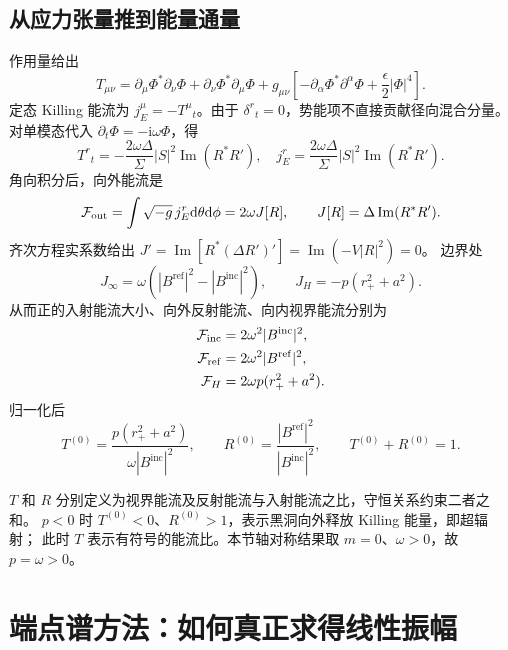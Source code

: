 \documentclass[UTF8,fontset=fandol,11pt,a4paper]{ctexart}
\newcommand{\ii}{\mathrm{i}}
\newcommand{\dd}{\mathrm{d}}
\newcommand{\Ima}{\operatorname{Im}}
\newcommand{\Bin}{B^{\mathrm{inc}}}
\newcommand{\Bref}{B^{\mathrm{ref}}}
\numberwithin{equation}{section}
\begin{document}
\subsection{从应力张量推到能量通量}
作用量给出
\begin{equation}
T_{\mu\nu}=\partial_\mu\Phi^*\partial_\nu\Phi+\partial_\nu\Phi^*\partial_\mu\Phi
+g_{\mu\nu}\left[-\partial_\alpha\Phi^*\partial^\alpha\Phi
+\frac{\epsilon}{2}|\Phi|^4\right].
\end{equation}
定态 Killing 能流为 $j_E^\mu=-T^\mu{}_t$。由于 $\delta^r{}_t=0$，势能项不直接贡献径向混合分量。
对单模态代入 $\partial_t\Phi=-\ii\omega\Phi$，得
\begin{equation}
T^r{}_t=-\frac{2\omega\Delta}{\Sigma}|S|^2\Ima(R^*R'),
\quad j_E^r=\frac{2\omega\Delta}{\Sigma}|S|^2\Ima(R^*R').
\end{equation}
角向积分后，向外能流是
\begin{equation}
\mathcal F_{\rm out}=\int\sqrt{-g}\,j_E^r\dd\theta\dd\phi
=2\omega J[R],\qquad J[R]=\Delta\Ima(R^*R').\label{current}
\end{equation}
齐次方程实系数给出
$J'=\Ima[R^*(\Delta R')']=\Ima(-V|R|^2)=0$。
边界处
\begin{equation}
J_\infty=\omega(|\Bref|^2-|\Bin|^2),\qquad
J_H=-p(r_+^2+a^2).
\end{equation}
从而正的入射能流大小、向外反射能流、向内视界能流分别为
\begin{align}
\mathcal F_{\rm inc}&=2\omega^2|\Bin|^2,\\
\mathcal F_{\rm ref}&=2\omega^2|\Bref|^2,\\
\mathcal F_H&=2\omega p(r_+^2+a^2).
\end{align}
归一化后
\begin{equation}
T^{(0)}=\frac{p(r_+^2+a^2)}{\omega|\Bin|^2},\qquad
R^{(0)}=\frac{|\Bref|^2}{|\Bin|^2},\qquad T^{(0)}+R^{(0)}=1.
\end{equation}
\begin{remarkbox}
$T$ 和 $R$ 分别定义为视界能流及反射能流与入射能流之比，守恒关系约束二者之和。
$p<0$ 时 $T^{(0)}<0$、$R^{(0)}>1$，表示黑洞向外释放 Killing 能量，即超辐射；
此时 $T$ 表示有符号的能流比。本节轴对称结果取 $m=0$、$\omega>0$，故 $p=\omega>0$。
\end{remarkbox}

\section{端点谱方法：如何真正求得线性振幅}
\end{document}
